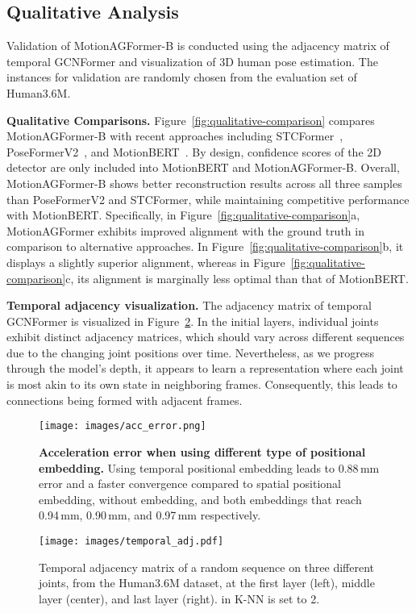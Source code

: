 \documentclass[10pt,twocolumn,letterpaper]{article}
\begin{document}
    \subsection{Qualitative Analysis}
    Validation of MotionAGFormer-B is conducted using the adjacency matrix of temporal GCNFormer and visualization of 3D human pose estimation. The instances for validation are randomly chosen from the evaluation set of Human3.6M.

   \textbf{Qualitative Comparisons.} Figure~\ref{fig:qualitative-comparison} compares MotionAGFormer-B with recent approaches including STCFormer~\cite{STCFormer}, PoseFormerV2~\cite{poseformerv2}, and MotionBERT~\cite{motionbert}. By design, confidence scores of the 2D detector are only included into MotionBERT and MotionAGFormer-B. Overall, MotionAGFormer-B shows better reconstruction results across all three samples than PoseFormerV2 and STCFormer, while maintaining competitive performance with MotionBERT. Specifically, in Figure~\ref{fig:qualitative-comparison}a, MotionAGFormer exhibits improved alignment with the ground truth in comparison to alternative approaches. In Figure~\ref{fig:qualitative-comparison}b, it displays a slightly superior alignment, whereas in Figure~\ref{fig:qualitative-comparison}c, its alignment is marginally less optimal than that of MotionBERT.
   
   \textbf{Temporal adjacency visualization.} The adjacency matrix of temporal GCNFormer is visualized in Figure~\ref{fig:temporal-adj}. In the initial layers, individual joints exhibit distinct adjacency matrices, which should vary across different sequences due to the changing joint positions over time. Nevertheless, as we progress through the model's depth, it appears to learn a representation where each joint is most akin to its own state in neighboring frames. Consequently, this leads to connections being formed with adjacent frames.


\begin{figure}[t]
  \centering
  \texttt{[image: images/acc\_error.png]}
  \caption{\textbf{Acceleration error when using different type of positional embedding.} Using temporal positional embedding leads to 0.88\,mm error and a faster convergence compared to spatial positional embedding, without embedding, and both embeddings that reach 0.94\,mm, 0.90\,mm, and 0.97\,mm respectively.}
  \label{fig:acc-error}
\end{figure}


\begin{figure}[!t]
  \centering
  \texttt{[image: images/temporal\_adj.pdf]}
  \caption{Temporal adjacency matrix of a random sequence on three different joints, from the Human3.6M dataset, at the first layer (left), middle layer (center), and last layer (right).  in K-NN is set to 2.}
  \label{fig:temporal-adj}
\end{figure}
\end{document}
